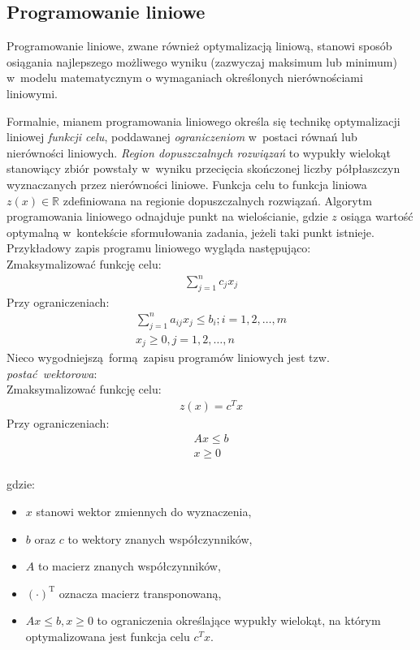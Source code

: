 \subsection{Programowanie liniowe}\label{ss_lp}
\par{
  Programowanie liniowe, zwane również optymalizacją liniową, stanowi sposób
  osiągania najlepszego możliwego wyniku (zazwyczaj maksimum lub minimum) w~modelu 
  matematycznym o wymaganiach określonych nierównościami liniowymi.
}
\par{
  Formalnie, mianem programowania liniowego określa się technikę optymalizacji liniowej \emph{funkcji celu}, poddawanej \emph{ograniczeniom} w~postaci równań lub nierówności liniowych.
  \emph{Region dopuszczalnych rozwiązań} to wypukły wielokąt stanowiący zbiór powstały w~wyniku przecięcia skończonej liczby półpłaszczyn wyznaczanych przez nierówności liniowe.
  Funkcja celu to funkcja liniowa $z(x) \in \mathbb{R}$ zdefiniowana na regionie dopuszczalnych rozwiązań.
  Algorytm programowania liniowego odnajduje punkt na wielościanie, gdzie $z$ osiąga wartość optymalną w~kontekście sformułowania zadania, jeżeli taki punkt istnieje. 
  Przykładowy zapis programu liniowego wygląda następująco:\\
  Zmaksymalizować funkcję celu:
  \begin{align*}
    \sum_{j=1}^{n} c_j x_j
  \end{align*}
  Przy ograniczeniach: \begin{align*}
    \sum_{j=1}^{n}a_{ij}x_j \leq b_i; i =1, 2, \ldots, m\\
    x_j \geq 0, j=1, 2, \ldots, n
  \end{align*}
  Nieco wygodniejszą~formą zapisu programów liniowych jest tzw.
  \emph{postać~wektorowa}:\\
  Zmaksymalizować funkcję celu:
  \begin{align*}
    z(x)={c^T}x
  \end{align*}
  Przy ograniczeniach: \begin{align*}
    Ax \leq b\\
    x\geq 0
  \end{align*}\\
  gdzie:
  \begin{itemize}
    \item $x$ stanowi wektor zmiennych do wyznaczenia,
    \item $b$ oraz $c$ to wektory znanych współczynników,
    \item $A$ to macierz znanych współczynników,
    \item ${(\cdot)}^\mathrm{T}$ oznacza macierz transponowaną,
    \item $Ax \leq b, x\geq 0$ to ograniczenia określające wypukły wielokąt,
      na którym optymalizowana jest funkcja celu $c^{T}x$.
  \end{itemize}
}
